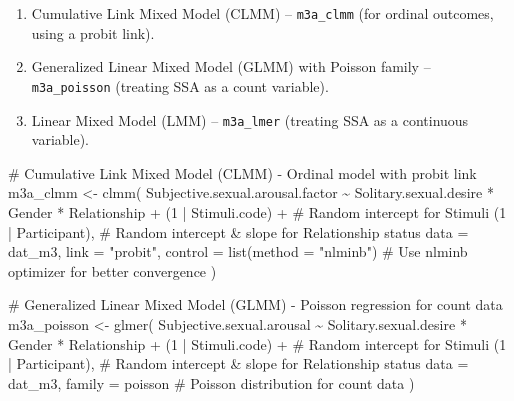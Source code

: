 \documentclass[
  bookmarksnumbered]{article}
\newenvironment{Shaded}{\begin{snugshade}}{\end{snugshade}}
\newcommand{\AttributeTok}[1]{\textcolor[rgb]{0.80,0.80,0.80}{#1}}
\newcommand{\CommentTok}[1]{\textcolor[rgb]{0.50,0.62,0.50}{#1}}
\newcommand{\DecValTok}[1]{\textcolor[rgb]{0.86,0.86,0.80}{#1}}
\newcommand{\FunctionTok}[1]{\textcolor[rgb]{0.94,0.94,0.56}{#1}}
\newcommand{\NormalTok}[1]{\textcolor[rgb]{0.80,0.80,0.80}{#1}}
\newcommand{\OtherTok}[1]{\textcolor[rgb]{0.94,0.94,0.56}{#1}}
\newcommand{\SpecialCharTok}[1]{\textcolor[rgb]{0.86,0.64,0.64}{#1}}
\newcommand{\StringTok}[1]{\textcolor[rgb]{0.80,0.58,0.58}{#1}}
\providecommand{\tightlist}{%
  \setlength{\itemsep}{0pt}\setlength{\parskip}{0pt}}
\begin{document}
\begin{enumerate}
\def\labelenumi{\arabic{enumi}.}
\tightlist
\item
  Cumulative Link Mixed Model (CLMM) -- \texttt{m3a\_clmm} (for ordinal outcomes, using a probit link).
\item
  Generalized Linear Mixed Model (GLMM) with Poisson family -- \texttt{m3a\_poisson} (treating SSA as a count variable).
\item
  Linear Mixed Model (LMM) -- \texttt{m3a\_lmer} (treating SSA as a continuous variable).
\end{enumerate}

\begin{Shaded}
\begin{Highlighting}[]
\CommentTok{\# Cumulative Link Mixed Model (CLMM) {-} Ordinal model with probit link}
\NormalTok{m3a\_clmm }\OtherTok{\textless{}{-}} \FunctionTok{clmm}\NormalTok{(}
\NormalTok{  Subjective.sexual.arousal.factor }\SpecialCharTok{\textasciitilde{}}\NormalTok{ Solitary.sexual.desire }\SpecialCharTok{*}\NormalTok{ Gender }\SpecialCharTok{*}\NormalTok{ Relationship }\SpecialCharTok{+}
\NormalTok{    (}\DecValTok{1} \SpecialCharTok{|}\NormalTok{ Stimuli.code) }\SpecialCharTok{+} \CommentTok{\# Random intercept for Stimuli}
\NormalTok{    (}\DecValTok{1} \SpecialCharTok{|}\NormalTok{ Participant), }\CommentTok{\# Random intercept \& slope for Relationship status}
  \AttributeTok{data =}\NormalTok{ dat\_m3,}
  \AttributeTok{link =} \StringTok{"probit"}\NormalTok{,}
  \AttributeTok{control =} \FunctionTok{list}\NormalTok{(}\AttributeTok{method =} \StringTok{"nlminb"}\NormalTok{) }\CommentTok{\# Use \textquotesingle{}nlminb\textquotesingle{} optimizer for better convergence}
\NormalTok{)}

\CommentTok{\# Generalized Linear Mixed Model (GLMM) {-} Poisson regression for count data}
\NormalTok{m3a\_poisson }\OtherTok{\textless{}{-}} \FunctionTok{glmer}\NormalTok{(}
\NormalTok{  Subjective.sexual.arousal }\SpecialCharTok{\textasciitilde{}}\NormalTok{ Solitary.sexual.desire }\SpecialCharTok{*}\NormalTok{ Gender }\SpecialCharTok{*}\NormalTok{ Relationship }\SpecialCharTok{+}
\NormalTok{    (}\DecValTok{1} \SpecialCharTok{|}\NormalTok{ Stimuli.code) }\SpecialCharTok{+} \CommentTok{\# Random intercept for Stimuli}
\NormalTok{    (}\DecValTok{1} \SpecialCharTok{|}\NormalTok{ Participant), }\CommentTok{\# Random intercept \& slope for Relationship status}
  \AttributeTok{data =}\NormalTok{ dat\_m3,}
  \AttributeTok{family =}\NormalTok{ poisson }\CommentTok{\# Poisson distribution for count data}
\NormalTok{)}


\end{Highlighting}
\end{Shaded}
\end{document}
